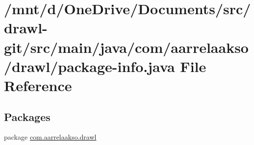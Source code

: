 \hypertarget{package-info_8java}{}\section{/mnt/d/\+One\+Drive/\+Documents/src/drawl-\/git/src/main/java/com/aarrelaakso/drawl/package-\/info.java File Reference}
\label{package-info_8java}
\subsection*{Packages}
\begin{DoxyCompactItemize}
\item 
package \hyperlink{namespacecom_1_1aarrelaakso_1_1drawl}{com.\+aarrelaakso.\+drawl}
\end{DoxyCompactItemize}

